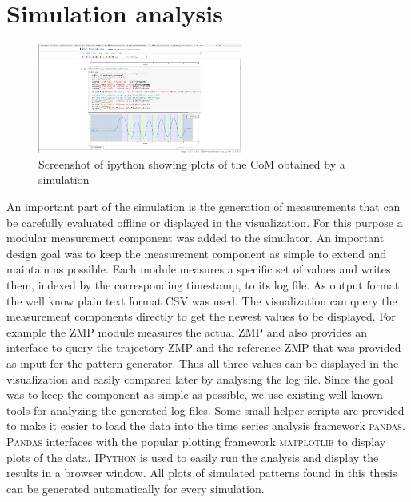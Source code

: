 \documentclass[english,ngerman]{KITreprt}
\newcommand{\name}[1]{\textsc{#1}}
\begin{document}
\section{Simulation analysis}\label{simulation-analysis}

\begin{figure}
  \begin{center}
     \includegraphics[width=0.6\textwidth]{images/plotting_screenshot.png}
  \end{center}
  \caption{Screenshot of ipython showing plots of the CoM obtained by a simulation}
\end{figure}

An important part of the simulation is the generation of measurements
that can be carefully evaluated offline or displayed in the
visualization. For this purpose a modular measurement component was
added to the simulator. An important design goal was to keep the
measurement component as simple to extend and maintain as possible. Each
module measures a specific set of values and writes them, indexed by the
corresponding timestamp, to its log file. As output format the well know
plain text format CSV was used. The visualization can query the
measurement components directly to get the newest values to be
displayed. For example the ZMP module measures the actual ZMP and also
provides an interface to query the trajectory ZMP and the reference ZMP
that was provided as input for the pattern generator. Thus all three
values can be displayed in the visualization and easily compared later
by analysing the log file. Since the goal was to keep the component as
simple as possible, we use existing well known tools for analyzing the
generated log files. Some small helper scripts are provided to make it
easier to load the data into the time series analysis framework
\name{pandas}. \name{Pandas} interfaces with the popular plotting
framework \name{matplotlib} to display plots of the data. \name{IPython}
is used to easily run the analysis and display the results in a browser
window. All plots of simulated patterns found in this thesis can be
generated automatically for every simulation.
\end{document}
